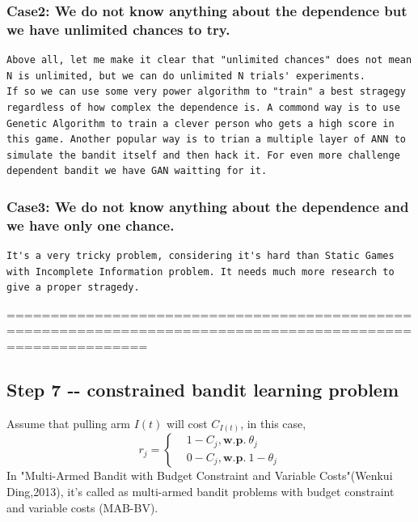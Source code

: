 \documentclass[11pt]{article}
\begin{document}
    \subsubsection{Case2: We do not know anything about the dependence but
we have unlimited chances to
try.}\label{case2-we-do-not-know-anything-about-the-dependence-but-we-have-unlimited-chances-to-try.}

    \begin{verbatim}
Above all, let me make it clear that "unlimited chances" does not mean N is unlimited, but we can do unlimited N trials' experiments.
If so we can use some very power algorithm to "train" a best stragegy regardless of how complex the dependence is. A commond way is to use Genetic Algorithm to train a clever person who gets a high score in this game. Another popular way is to trian a multiple layer of ANN to simulate the bandit itself and then hack it. For even more challenge dependent bandit we have GAN waitting for it.
\end{verbatim}

    \subsubsection{Case3: We do not know anything about the dependence and
we have only one
chance.}\label{case3-we-do-not-know-anything-about-the-dependence-and-we-have-only-one-chance.}

    \begin{verbatim}
It's a very tricky problem, considering it's hard than Static Games with Incomplete Information problem. It needs much more research to give a proper stragedy.
\end{verbatim}

    ============================================================================================================

    \subsection{Step 7 -\/- constrained bandit learning
problem}\label{step-7----constrained-bandit-learning-problem}

    Assume that pulling arm \(I(t)\) will cost \(C_{I(t)}\), in this case,
\[
r_j=\left\{
\begin{aligned}
    &1-C_j, \textbf{w.p.}\ \theta_j\\
    &0-C_j, \textbf{w.p.}\ 1-\theta_j
\end{aligned}
\right.
\] In "Multi-Armed Bandit with Budget Constraint and Variable
Costs"(Wenkui Ding,2013), it's called as multi-armed bandit problems
with budget constraint and variable costs (MAB-BV).
\end{document}
